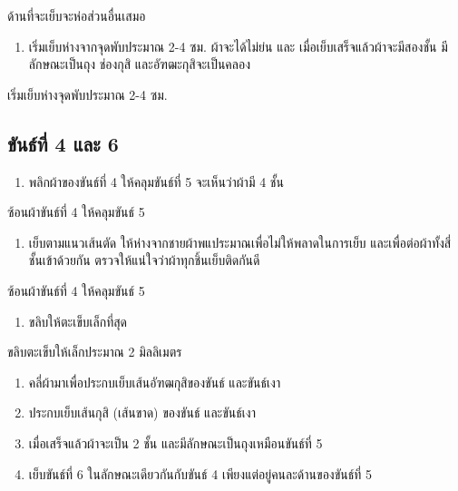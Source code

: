 
ด้านที่จะเย็บจะห่อส่วนอื่นเสมอ

\begin{enumerate}
\def\labelenumi{(\arabic{enumi})}
\setcounter{enumi}{5}
\tightlist
\item
  เริ่มเย็บห่างจากจุดพับประมาณ 2-4 ซม. ผ้าจะได้ไม่ย่น และ
  เมื่อเย็บเสร็จแล้วผ้าจะมีสองชั้น มีลักษณะเป็นถุง ช่องกุสิ
  และอัฑฒะกุสิจะเป็นคลอง
\end{enumerate}


เริ่มเย็บห่างจุดพับประมาณ 2-4 ซม.

\subsection{ขันธ์ที่ 4 และ 6}

\begin{enumerate}
\def\labelenumi{(\arabic{enumi})}
\tightlist
\item
  พลิกผ้าของขันธ์ที่ 4 ให้คลุมขันธ์ที่ 5 จะเห็นว่าผ้ามี 4 ชั้น
\end{enumerate}


ซ้อนผ้าขันธ์ที่ 4 ให้คลุมขันธ์ 5

\begin{enumerate}
\def\labelenumi{(\arabic{enumi})}
\setcounter{enumi}{1}
\tightlist
\item
  เย็บตามแนวเส้นตัด ให้ห่างจากชายผ้าพแประมาณเพื่อไม่ให้พลาดในการเย็บ
  และเพื่อต่อผ้าทั้งสี่ชั้นเข้าด้วยกัน
  ตรวจให้แน่ใจว่าผ้าทุกชิ้นเย็บติดกันดี
\end{enumerate}


ซ้อนผ้าขันธ์ที่ 4 ให้คลุมขันธ์ 5

\begin{enumerate}
\def\labelenumi{(\arabic{enumi})}
\setcounter{enumi}{2}
\tightlist
\item
  ขลิบให้ตะเข็บเล็กที่สุด
\end{enumerate}


ขลิบตะเข็บให้เล็กประมาณ 2 มิลลิเมตร

\begin{enumerate}
\def\labelenumi{(\arabic{enumi})}
\setcounter{enumi}{3}
\item
  คลี่ผ้ามาเพื่อประกบเย็บเส้นอัฑฒกุสิของขันธ์ และขันธ์เงา
\item
  ประกบเย็บเส้นกุสิ (เส้นขาด) ของขันธ์ และขันธ์เงา
\item
  เมื่อเสร็จแล้วผ้าจะเป็น 2 ชั้น และมีลักษณะเป็นถุงเหมือนขันธ์ที่ 5
\item
  เย็บขันธ์ที่ 6 ในลักษณะเดียวกันกับขันธ์ 4
  เพียงแต่อยู่คนละด้านของขันธ์ที่ 5
\end{enumerate}

